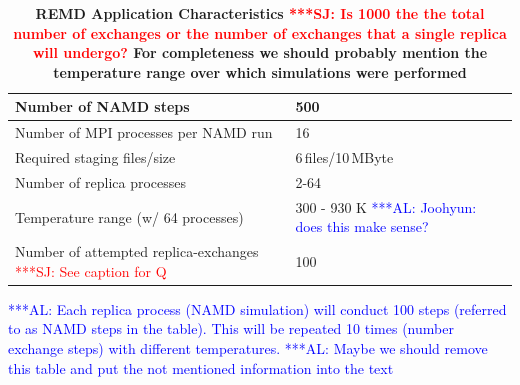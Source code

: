 \documentclass{rspublic}
\newcommand{\alnote}[1]{ {\textcolor{blue} { ***AL: #1 }}}
\newcommand{\jhanote}[1]{ {\textcolor{red} { ***SJ: #1 }}}
\newcommand{\alnote}[1]{}
\newcommand{\jhanote}[1]{}
\begin{document}
\begin{table}
    \centering
	\begin{tabular}{|p{5cm}|l|}
          \hline
          Number of NAMD steps &500\\ \hline 
          Number of MPI processes per NAMD run &16\\ \hline 
          Required staging files/size &6\,files/10\,MByte\\ \hline
          Number of replica processes &2-64 \\ \hline   
          Temperature range (w/ 64 processes) &300 - 930 K \alnote{Joohyun: does this make sense?} \\ \hline
          Number of attempted replica-exchanges \jhanote{See caption for Q} &100\\ \hline
	\end{tabular}
	\caption{\footnotesize \bf REMD Application Characteristics\label{tab:app_stats}
          \jhanote{Is 1000 the the total number of exchanges or the
            number of exchanges that a single replica will undergo?}
          For completeness we should probably mention the temperature
          range over which simulations were performed}
          \alnote{Each replica process (NAMD simulation) will conduct 
          100 steps (referred to as NAMD steps in the table). This 
          will be repeated 10 times (number exchange steps) with 
          different temperatures.}         
          \alnote{Maybe we should remove this table and put the not mentioned information 
          into the text}
          
\end{table}  
 
\end{document}
